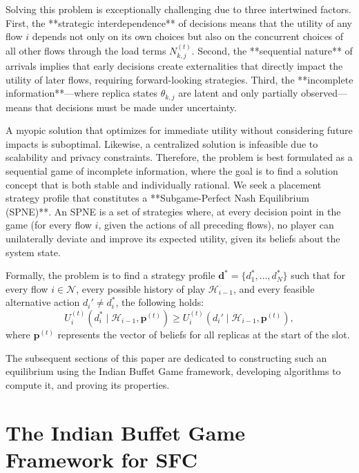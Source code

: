 \documentclass[journal]{IEEEtran}
\theoremstyle{plain}
\theoremstyle{definition}
\theoremstyle{remark}
\begin{document}
Solving this problem is exceptionally challenging due to three intertwined factors. First, the **strategic interdependence** of decisions means that the utility of any flow $i$ depends not only on its own choices but also on the concurrent choices of all other flows through the load terms $N_{k,j}^{(t)}$. Second, the **sequential nature** of arrivals implies that early decisions create externalities that directly impact the utility of later flows, requiring forward-looking strategies. Third, the **incomplete information**—where replica states $\theta_{k,j}$ are latent and only partially observed—means that decisions must be made under uncertainty.

A myopic solution that optimizes for immediate utility without considering future impacts is suboptimal. Likewise, a centralized solution is infeasible due to scalability and privacy constraints. Therefore, the problem is best formulated as a sequential game of incomplete information, where the goal is to find a solution concept that is both stable and individually rational. We seek a placement strategy profile that constitutes a **Subgame-Perfect Nash Equilibrium (SPNE)**. An SPNE is a set of strategies where, at every decision point in the game (for every flow $i$, given the actions of all preceding flows), no player can unilaterally deviate and improve its expected utility, given its beliefs about the system state.

Formally, the problem is to find a strategy profile $\mathbf{d}^* = \{d_1^*, \dots, d_N^*\}$ such that for every flow $i \in \mathcal{N}$, every possible history of play $\mathcal{H}_{i-1}$, and every feasible alternative action $d_i' \neq d_i^*$, the following holds:
\begin{equation}
U_i^{(t)}(d_i^* \mid \mathcal{H}_{i-1}, \mathbf{p}^{(t)}) \ge U_i^{(t)}(d_i' \mid \mathcal{H}_{i-1}, \mathbf{p}^{(t)}),
\label{eq:spne_condition}
\end{equation}
where $\mathbf{p}^{(t)}$ represents the vector of beliefs for all replicas at the start of the slot.

The subsequent sections of this paper are dedicated to constructing such an equilibrium using the Indian Buffet Game framework, developing algorithms to compute it, and proving its properties.


\section{The Indian Buffet Game Framework for SFC}
\label{sec:ibg_framework}
\end{document}
